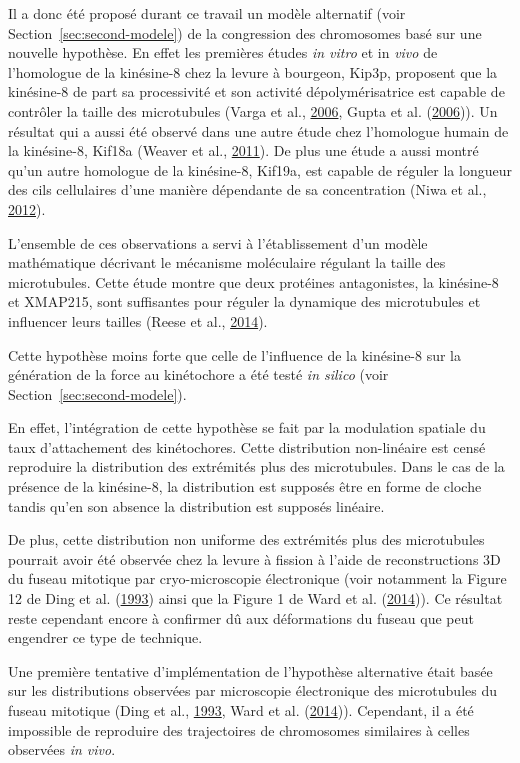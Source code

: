 \documentclass[12pt,a4paper,twoside,openright]{book}
\begin{document}
Il a donc été proposé durant ce travail un modèle alternatif (voir
Section~\ref{sec:second-modele}) de la congression des chromosomes basé
sur une nouvelle hypothèse. En effet les premières études \emph{in
vitro} et in \emph{vivo} de l'homologue de la kinésine-8 chez la levure
à bourgeon, Kip3p, proposent que la kinésine-8 de part sa processivité
et son activité dépolymérisatrice est capable de contrôler la taille des
microtubules (Varga et al., \hyperref[ref-Varga2006]{2006}, Gupta et al.
(\hyperref[ref-Gupta2006]{2006})). Un résultat qui a aussi été observé
dans une autre étude chez l'homologue humain de la kinésine-8, Kif18a
(Weaver et al., \hyperref[ref-Weaver2011]{2011}). De plus une étude a
aussi montré qu'un autre homologue de la kinésine-8, Kif19a, est capable
de réguler la longueur des cils cellulaires d'une manière dépendante de
sa concentration (Niwa et al., \hyperref[ref-Niwa2012]{2012}).

L'ensemble de ces observations a servi à l'établissement d'un modèle
mathématique décrivant le mécanisme moléculaire régulant la taille des
microtubules. Cette étude montre que deux protéines antagonistes, la
kinésine-8 et XMAP215, sont suffisantes pour réguler la dynamique des
microtubules et influencer leurs tailles (Reese et al.,
\hyperref[ref-Reese2014a]{2014}).

Cette hypothèse moins forte que celle de l'influence de la kinésine-8
sur la génération de la force au kinétochore a été testé \emph{in
silico} (voir Section~\ref{sec:second-modele}).

En effet, l'intégration de cette hypothèse se fait par la modulation
spatiale du taux d'attachement des kinétochores. Cette distribution
non-linéaire est censé reproduire la distribution des extrémités plus
des microtubules. Dans le cas de la présence de la kinésine-8, la
distribution est supposés être en forme de cloche tandis qu'en son
absence la distribution est supposés linéaire.

De plus, cette distribution non uniforme des extrémités plus des
microtubules pourrait avoir été observée chez la levure à fission à
l'aide de reconstructions 3D du fuseau mitotique par cryo-microscopie
électronique (voir notamment la Figure 12 de Ding et al.
(\hyperref[ref-Ding1993a]{1993}) ainsi que la Figure 1 de Ward et al.
(\hyperref[ref-Ward2014]{2014})). Ce résultat reste cependant encore à
confirmer dû aux déformations du fuseau que peut engendrer ce type de
technique.

Une première tentative d'implémentation de l'hypothèse alternative était
basée sur les distributions observées par microscopie électronique des
microtubules du fuseau mitotique (Ding et al.,
\hyperref[ref-Ding1993a]{1993}, Ward et al.
(\hyperref[ref-Ward2014]{2014})). Cependant, il a été impossible de
reproduire des trajectoires de chromosomes similaires à celles observées
\emph{in vivo}.
\end{document}
